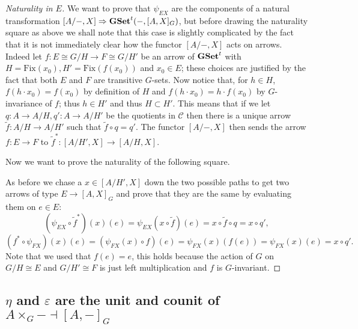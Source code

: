 \documentclass[italian, 12pt, reqno]{article}
\theoremstyle{myteo}
\numberwithin{equation}{section}
\newcommand{\cat}[1]{\mathscr{#1}}
\newcommand{\gset}{\text{\textbf{GSet}}}
\newcommand{\tgset}{\text{\textbf{GSet}}^t}
\newcommand{\fix}[1]{\text{Fix}(#1)}
\newcommand{\homs}[2]{[#1, #2]}
\newcommand{\fun}[3]{#1\colon#2\to #3}
\begin{document}
\begin{proof}[Naturality in \(E\)]
  \label{proof:naturality_in_E}
  We want to prove that \(\psi_{EX}\) are the components of a natural transformation \(\homs{A/-}{X}\Rightarrow\tgset(-, \homs{A}{X}_G)\), but before drawing the naturality square as above we shall note that this case is slightly complicated by the fact that it is not immediately clear how the functor \(\homs{A/-}{X}\) acts on arrows.
  Indeed let \(\fun{f}{E\cong G/H}{F\cong G/H'}\) be an arrow of \(\tgset\) with \(H = \fix{x_0}, H' = \fix{f(x_0)}\) and \(x_0\in E\); these choices are justified by the fact that both \(E\) and \(F\) are transitive \(G\)-sets.
  Now notice that, for \(h\in H\), \(f(h\cdot x_0) = f(x_0)\) by definition of \(H\) and \(f(h\cdot x_0) = h\cdot f(x_0)\) by \(G\)-invariance of \(f\); thus \(h\in H'\) and thus \(H\subset H'\).
  This means that if we let \(\fun{q}{A}{A/H}, \fun{q'}{A}{A/H'}\) be the quotients in \(\cat{C}\) then there is a unique arrow \(\fun{\widetilde{f}}{A/H}{A/H'}\) such that \(\widetilde{f}\circ q = q'\).
  The functor \(\homs{A/-}{X}\) then sends the arrow \(\fun{f}{E}{F}\) to \(\fun{\widetilde{f}^*}{\homs{A/H'}{X}}{\homs{A/H}{X}}\).

  Now we want to prove the naturality of the following square.
  \begin{center}
  \end{center}
  As before we chase a \(x\in\homs{A/H'}{X}\) down the two possible paths to get two arrows of type \(E\to\homs{A}{X}_G\) and prove that they are the same by evaluating them on \(e\in E\):
  \[(\psi_{EX}\circ \widetilde{f}^*)(x)(e) = \psi_{EX}(x\circ \widetilde{f})(e) = x\circ \widetilde{f}\circ q = x\circ q',\]
  \[(f^*\circ \psi_{FX})(x)(e) = (\psi_{FX}(x)\circ f)(e) = \psi_{FX}(x)(f(e)) = \psi_{FX}(x)(e) = x\circ q'.\]
  Note that we used that \(f(e) = e\), this holds because the action of \(G\) on \(G/H \cong E\) and \(G/H'\cong F\) is just left multiplication and \(f\) is \(G\)-invariant.
\end{proof}

\subsection{\(\eta\) and \(\varepsilon\) are the unit and counit of \(A\times_G- \dashv \homs{A}{-}_G\)}
\end{document}
